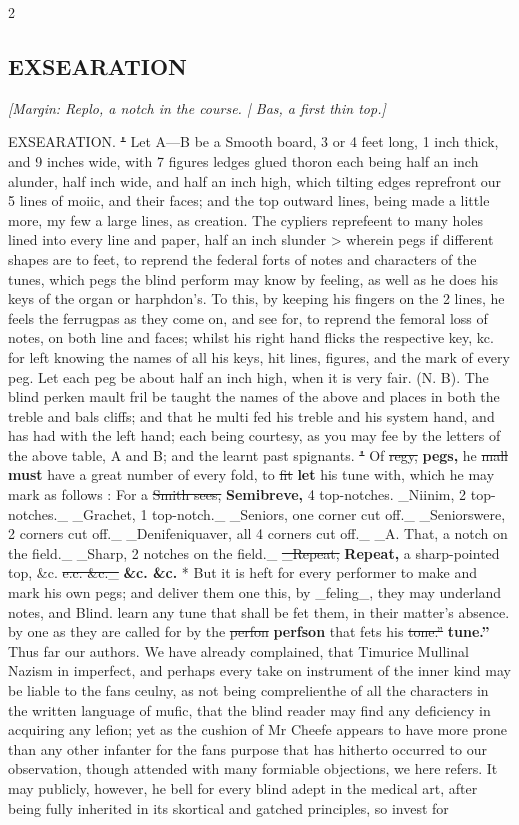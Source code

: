 \documentclass[10pt]{article}
\begin{document}
\begin{multicols}{2}
\subsection*{EXSEARATION}
{\small\itshape [Margin: Replo, a notch in the course. | \emph{Bas, a first thin top.}]}\par
EXSEARATION. \sout{"} Let A—B be a Smooth board, 3 or 4 feet long, 1 inch thick, and 9 inches wide, with 7 figures ledges glued thoron each being half an inch alunder, half inch wide, and half an inch high, which tilting edges reprefront our 5 lines of moiic, and their faces; and the top outward lines, being made a little more, my few a large lines, as creation. The cypliers reprefeent to many holes lined into every line and paper, half an inch slunder > wherein pegs if different shapes are to feet, to reprend the federal forts of notes and characters of the tunes, which pegs the blind perform may know by feeling, as well as he does his keys of the organ or harphdon’s. To this, by keeping his fingers on the 2 lines, he feels the ferrugpas as they come on, and see for, to reprend the femoral loss of notes, on both line and faces; whilst his right hand flicks the respective key, kc. for left knowing the names of all his keys, hit lines, figures, and the mark of every peg. Let each peg be about half an inch high, when it is very fair. (N. B). The blind perken mault fril be taught the names of the above and places in both the treble and bals cliffs; and that he multi fed his treble and his system hand, and has had with the left hand; each being courtesy, as you may fee by the letters of the above table, A and B; and the learnt past spignants. \sout{"} Of \sout{regy,} \textbf{pegs,} he \sout{mall} \textbf{must} have a great number of every fold, to \sout{fit} \textbf{let} his tune with, which he may mark as follows : For a \sout{Smith sees,} \textbf{Semibreve,} 4 top-notches. \_Niinim, 2 top-notches.\_ \_Grachet, 1 top-notch.\_ \_Seniors, one corner cut off.\_ \_Seniorswere, 2 corners cut off.\_ \_Denifeniquaver, all 4 corners cut off.\_ \_A. That, a notch on the field.\_ \_Sharp, 2 notches on the field.\_ \sout{\_Repeat,} \textbf{Repeat,} a sharp-pointed top, \&c. \sout{e.c. \&c.\_} \textbf{\&c. \&c.} * But it is heft for every performer to make and mark his own pegs; and deliver them one this, by \_feling\_, they may underland notes, and Blind. learn any tune that shall be fet them, in their matter’s absence. by one as they are called for by the \sout{perfon} \textbf{perfson} that fets his \sout{tone.”} \textbf{tune.”} Thus far our authors. We have already complained, that Timurice Mullinal Nazism in imperfect, and perhaps every take on instrument of the inner kind may be liable to the fans ceulny, as not being comprelienthe of all the characters in the written language of mufic, that the blind reader may find any deficiency in acquiring any lefion; yet as the cushion of Mr Cheefe appears to have more prone than any other infanter for the fans purpose that has hitherto occurred to our observation, though attended with many formiable objections, we here refers. It may publicly, however, he bell for every blind adept in the medical art, after being fully inherited in its skortical and gatched principles, so invest for 
\end{multicols}
\end{document}

